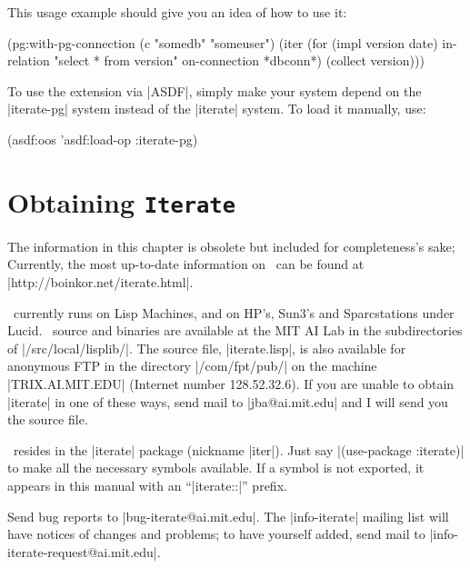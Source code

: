 This usage example should give you an idea of how to use it:

\begin{program}
(pg:with-pg-connection (c "somedb" "someuser")
  (iter (for (impl version date) in-relation "select * from version"
                                 on-connection *dbconn*)
        (collect version)))
\end{program}

To use the extension via |ASDF|, simply make your system depend on the
|iterate-pg| system instead of the |iterate| system. To load it
manually, use:

\begin{program}
  (asdf:oos 'asdf:load-op :iterate-pg)
\end{program}

\section{Obtaining {\tt Iterate}}

\begin{sloppypar}
The information in this chapter is obsolete but included for
completeness's sake; Currently, the most up-to-date information on
\iter\ can be found at |http://boinkor.net/iterate.html|.
\end{sloppypar}

\begin{sloppypar}
\iter\ currently runs on Lisp Machines, and on
HP's, Sun3's and Sparcstations under Lucid.  
\iter\ source and binaries are available at the MIT AI Lab in the
subdirectories of |/src/local/lisplib/|.  The source file,
|iterate.lisp|, is also available for anonymous FTP in the directory
|/com/fpt/pub/| on the machine |TRIX.AI.MIT.EDU| (Internet number
128.52.32.6).  If you are unable to obtain |iterate| in one of these
ways, send mail to |jba@ai.mit.edu| and I will send you the source
file. 
\end{sloppypar}

\begin{sloppypar}
\iter\ resides in the |iterate| package (nickname |iter|).  Just say
\linebreak |(use-package :iterate)| to make all the necessary symbols
available. 
If a symbol is not exported, it appears in this manual with an
``|iterate::|'' prefix.
\end{sloppypar}

Send bug reports to |bug-iterate@ai.mit.edu|.  The |info-iterate|
mailing list will have notices of changes and problems; to have
yourself added, send mail to |info-iterate-request@ai.mit.edu|.



